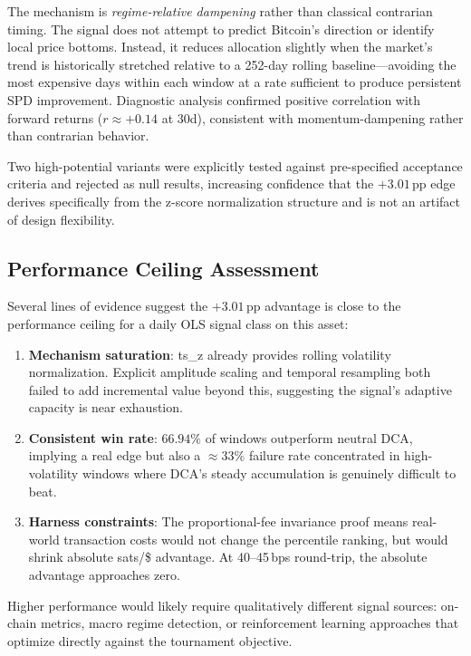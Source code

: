 \documentclass[11pt,letterpaper]{article}
\begin{document}
The mechanism is \emph{regime-relative dampening} rather than classical
contrarian timing.  The signal does not attempt to predict Bitcoin's direction or
identify local price bottoms.  Instead, it reduces allocation slightly when the
market's trend is historically stretched relative to a 252-day rolling
baseline---avoiding the most expensive days within each window at a rate
sufficient to produce persistent SPD improvement.  Diagnostic analysis confirmed
positive correlation with forward returns ($r\approx +0.14$ at 30d), consistent
with momentum-dampening rather than contrarian behavior.

Two high-potential variants were explicitly tested against pre-specified
acceptance criteria and rejected as null results, increasing confidence that
the $+3.01$\,pp edge derives specifically from the z-score normalization structure
and is not an artifact of design flexibility.

\subsection{Performance Ceiling Assessment}

Several lines of evidence suggest the $+3.01$\,pp advantage is close to the
performance ceiling for a daily OLS signal class on this asset:

\begin{enumerate}
  \item \textbf{Mechanism saturation}: ts\_z already provides rolling volatility
    normalization.  Explicit amplitude scaling and temporal resampling both failed
    to add incremental value beyond this, suggesting the signal's adaptive
    capacity is near exhaustion.

  \item \textbf{Consistent win rate}: $66.94\%$ of windows outperform neutral
    DCA, implying a real edge but also a $\approx33\%$ failure rate concentrated
    in high-volatility windows where DCA's steady accumulation is genuinely
    difficult to beat.

  \item \textbf{Harness constraints}: The proportional-fee invariance proof means
    real-world transaction costs would not change the percentile ranking, but
    would shrink absolute sats/\$ advantage.  At 40--45\,bps round-trip, the
    absolute advantage approaches zero.
\end{enumerate}

Higher performance would likely require qualitatively different signal sources:
on-chain metrics, macro regime detection, or reinforcement learning approaches
that optimize directly against the tournament objective.
\end{document}
